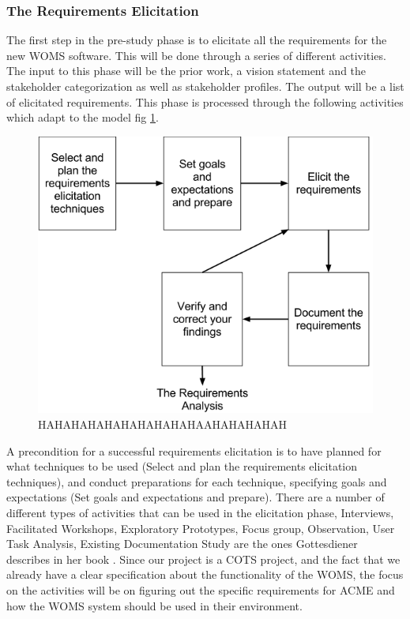 \documentclass[a4paper]{article}
\begin{document}
\subsubsection{The Requirements Elicitation}
\label{subsub:the_requirements_elicitation}

The first step in the pre-study phase is to elicitate all the requirements for the new WOMS software. This will be done through a series of different activities. The input to this phase will be the prior work, a vision statement and the stakeholder categorization as well as stakeholder profiles. The output will be a list of elicitated requirements. This phase is processed through the following activities which adapt to the model fig \ref{figure:elicitation}. 

\begin{figure}[H]
	\includegraphics[width=1\textwidth]{images/elicitation_model.png}
	\caption{HAHAHAHAHAHAHAHAHAHAAHAHAHAHAH}
	\label{figure:elicitation}
\end{figure}


A precondition for a successful requirements elicitation is to have planned for what techniques to be used (Select and plan the requirements elicitation techniques), and conduct preparations for each technique, specifying goals and expectations (Set goals and expectations and prepare). There are a number of different types of activities that can be used in the elicitation phase, Interviews, Facilitated Workshops, Exploratory Prototypes, Focus group, Observation, User Task Analysis, Existing Documentation Study are the ones Gottesdiener describes in her book \cite{gott64}. Since our project is a COTS project, and the fact that we already have a clear specification about the functionality of the WOMS, the focus on the activities will be on figuring out the specific requirements for ACME and how the WOMS system should be used in their environment.
\end{document}
